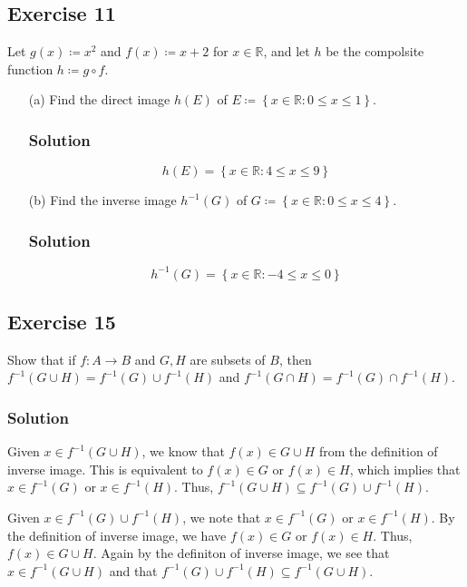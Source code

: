 \documentclass[12pt]{article}
\begin{document}
\subsection*{Exercise 11}
Let $g\left(x\right) \coloneqq x^2$  and $f\left(x\right) \coloneqq x + 2$ for $x \in \mathbb{R}$, and let $h$ be the compolsite function $h \coloneqq g \circ f$.
\begin{itemize}
\item[(a)] Find the direct image $h\left(E\right)$ of $E \coloneqq \left\{x \in \mathbb{R} : 0 \leq x \leq 1\right\}$.
\subsubsection*{Solution}
\[
h\left(E\right) = \left\{x \in \mathbb{R} : 4 \leq x \leq 9\right\}
\]
\item[(b)] Find the inverse image $h^{-1}\left(G\right)$ of $G \coloneqq \left\{x \in \mathbb{R} : 0 \leq x \leq 4\right\}$.
\subsubsection*{Solution}
\[
h^{-1}\left(G\right) = \left\{x \in \mathbb{R} : -4 \leq x \leq 0\right\}
\]
\end{itemize}

\subsection*{Exercise 15}
Show that if $f : A \to B$ and $G, H$ are subsets of $B$, then $f^{-1}\left(G \cup H\right) = f^{-1}\left(G\right) \cup f^{-1}\left(H\right)$ and $f^{-1}\left(G \cap H\right) = f^{-1}\left(G\right) \cap f^{-1}\left(H\right)$.

\subsubsection*{Solution}
Given $x \in f^{-1}\left(G \cup H\right)$, we know that $f\left(x\right) \in G \cup H$ from the definition of inverse image. This is equivalent to $f(x) \in G$ or $f(x) \in H$, which implies that $x \in f^{-1}(G)$ or $x \in f^{-1}(H)$. Thus, $f^{-1}\left(G \cup H\right) \subseteq f^{-1}(G) \cup f^{-1}(H)$.

Given $x \in f^{-1}(G) \cup f^{-1}(H)$, we note that $x \in f^{-1}(G)$ or $x \in f^{-1}(H)$. By the definition of inverse image, we have $f(x) \in G$ or $f(x) \in H$. Thus, $f(x) \in G \cup H$. Again by the definiton of inverse image, we see that $x \in f^{-1}\left(G \cup H\right)$ and that $f^{-1}(G) \cup f^{-1}(H) \subseteq f^{-1}\left(G \cup H\right)$.
\end{document}
